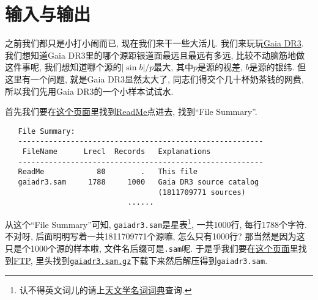 \chapter{输入与输出}

之前我们都只是小打小闹而已, 现在我们来干一些大活儿. 我们来玩玩\href{https://cdsarc.cds.unistra.fr/viz-bin/cat/I/355}{Gaia DR3}. 我们想知道Gaia DR3里的哪个源距银道面最远且最远有多远, 比较不动脑筋地做这件事呢, 我们想知道哪个源的$\left\lvert \sin b\right\rvert/p$最大, 其中$p$是源的视差, $b$是源的银纬. 但这里有一个问题, 就是Gaia DR3显然太大了, 同志们得交个几十杯奶茶钱的网费, 所以我们先用Gaia DR3的一个小样本试试水.

首先我们要在\href{https://cdsarc.cds.unistra.fr/viz-bin/cat/I/355}{这个页面}里找到\href{https://cdsarc.cds.unistra.fr/viz-bin/ReadMe/I/355?format=html&tex=true}{ReadMe}点进去, 找到``File Summary''.
\begin{verbatim}
   File Summary:
   --------------------------------------------------------
    FileName      Lrecl  Records   Explanations
   --------------------------------------------------------
   ReadMe            80        .   This file
   gaiadr3.sam     1788     1000   Gaia DR3 source catalog
                                   (1811709771 sources)
                            ......
\end{verbatim}
从这个``File Summary''可知, \verb|gaiadr3.sam|是星表\footnote{认不得英文词儿的请上\href{https://nadc.china-vo.org/astrodict/}{天文学名词词典}查询.}, 一共1000行, 每行1788个字符. 不对呀, 后面明明写着一共1811709771个源嘛, 怎么只有1000行? 那当然是因为这只是个1000个源的样本啦, 文件名后缀可是\verb|.sam|呢. 于是乎我们要在\href{https://cdsarc.cds.unistra.fr/viz-bin/cat/I/355}{这个页面}里找到\href{https://cdsarc.cds.unistra.fr/ftp/I/355}{FTP}, 里头找到\href{https://cdsarc.cds.unistra.fr/ftp/I/355/gaiadr3.sam.gz}{\texttt{gaiadr3.sam.gz}}下载下来然后解压得到\verb|gaiadr3.sam|.

